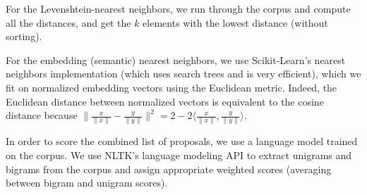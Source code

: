 \documentclass[11pt]{article}
\begin{document}
For the Levenshtein-nearest neighbors, we run through the corpus and compute all the distances, and get the $k$ elements with the lowest distance (without sorting).

For the embedding (semantic) nearest neighbors, we use Scikit-Learn's nearest neighbors implementation \cite{scikit-learn} (which uses search trees and is very efficient), which we fit on normalized embedding vectors using the Euclidean metric. Indeed, the Euclidean distance between normalized vectors is equivalent to the cosine distance because $\|\frac{x}{\|x\|} - \frac{y}{\|y\|}\|^2 = 2 - 2\langle \frac{x}{\|x\|}, \frac{y}{\|y\|}\rangle$.

In order to score the combined list of proposals, we use a language model trained on the corpus. We use NLTK's language modeling API to extract unigrams and bigrams from the corpus and assign appropriate weighted scores (averaging between bigram and unigram scores).

\printbibliography{}
\end{document}
